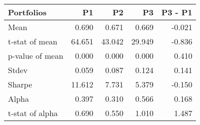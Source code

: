 \begin{tabular}{lrrrr}
\toprule
Portfolios & P1 & P2 & P3 & P3 - P1 \\
\midrule
Mean & 0.690 & 0.671 & 0.669 & -0.021 \\
t-stat of mean & 64.651 & 43.042 & 29.949 & -0.836 \\
p-value of mean & 0.000 & 0.000 & 0.000 & 0.410 \\
Stdev & 0.059 & 0.087 & 0.124 & 0.141 \\
Sharpe & 11.612 & 7.731 & 5.379 & -0.150 \\
Alpha & 0.397 & 0.310 & 0.566 & 0.168 \\
t-stat of alpha & 0.690 & 0.550 & 1.010 & 1.487 \\
\bottomrule
\end{tabular}
